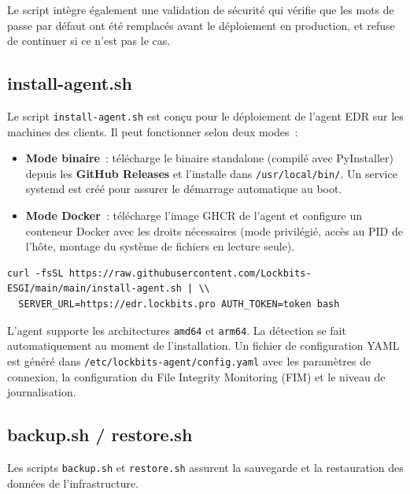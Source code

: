Le script intègre également une validation de sécurité qui vérifie que les mots
de passe par défaut ont été remplacés avant le déploiement en production, et
refuse de continuer si ce n'est pas le cas.

\subsection{install-agent.sh}

Le script \texttt{install-agent.sh} est conçu pour le déploiement de l'agent
EDR sur les machines des clients. Il peut fonctionner selon deux modes~:

\begin{itemize}
  \item \textbf{Mode binaire}~: télécharge le binaire standalone (compilé avec
    PyInstaller) depuis les \textbf{GitHub Releases} et l'installe dans
    \texttt{/usr/local/bin/}. Un service systemd est créé pour assurer le
    démarrage automatique au boot.
  \item \textbf{Mode Docker}~: télécharge l'image GHCR de l'agent et configure
    un conteneur Docker avec les droits nécessaires (mode privilégié, accès au
    PID de l'hôte, montage du système de fichiers en lecture seule).
\end{itemize}

\begin{lstlisting}[language=dockerbash, caption={Installation de l'agent EDR (mode binaire)}, label={lst:install-agent}]
curl -fsSL https://raw.githubusercontent.com/Lockbits-ESGI/main/main/install-agent.sh | \\
  SERVER_URL=https://edr.lockbits.pro AUTH_TOKEN=token bash
\end{lstlisting}

L'agent supporte les architectures \texttt{amd64} et \texttt{arm64}. La
détection se fait automatiquement au moment de l'installation. Un fichier de
configuration YAML est généré dans \texttt{/etc/lockbits-agent/config.yaml}
avec les paramètres de connexion, la configuration du File Integrity Monitoring
(FIM) et le niveau de journalisation.

\subsection{backup.sh / restore.sh}

Les scripts \texttt{backup.sh} et \texttt{restore.sh} assurent la sauvegarde et
la restauration des données de l'infrastructure.

